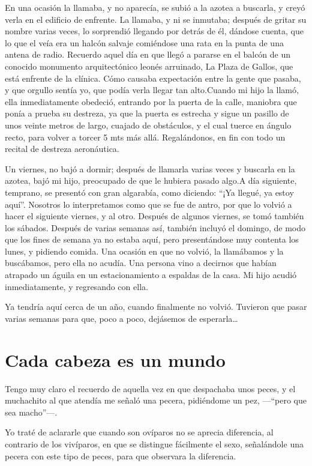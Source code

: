 \documentclass[letterpaper, 12pt]{book}
\begin{document}
En una ocasión la llamaba, y no aparecía, se subió a la azotea a buscarla, y creyó verla en el edificio de enfrente. La llamaba, y ni se inmutaba; después de gritar su nombre varias veces, lo sorprendió llegando por detrás de él, dándose cuenta, que lo que el veía era un halcón salvaje comiéndose una rata en la punta de una antena de radio. Recuerdo aquel día en que llegó a pararse en el balcón de un conocido monumento arquitectónico leonés arruinado, La Plaza de Gallos, que está enfrente de la clínica. Cómo causaba expectación entre la gente que pasaba, y que orgullo sentía yo, que podía verla llegar tan alto.Cuando mi hijo la llamó, ella inmediatamente obedeció, entrando por la puerta de la calle, maniobra que ponía a prueba su destreza, ya que la puerta es estrecha y sigue un pasillo de unos veinte metros de largo, cuajado de obstáculos, y el cual tuerce en ángulo recto, para volver a torcer 5 mts más allá. Regalándonos, en fin con todo un recital de destreza aeronáutica.


Un viernes, no bajó a dormir; después de llamarla varias veces y buscarla en la azotea, bajó mi hijo, preocupado de que le hubiera pasado algo.A día siguiente, temprano, se presentó con gran algarabía, como diciendo: ``¡Ya llegué, ya estoy aquí''. Nosotros lo interpretamos como que se fue de antro, por que lo volvió a hacer el siguiente viernes, y al otro. Después de algunos viernes, se tomó también los sábados. Después de varias semanas así, también incluyó el domingo, de modo que los fines de semana ya no estaba aquí, pero presentándose muy contenta los lunes, y pidiendo comida. Una ocasión en que no volvió, la llamábamos y  la buscábamos, pero ella no acudía. Una persona vino a decirnos que habían atrapado un águila en un estacionamiento a espaldas de la casa. Mi hijo acudió inmediatamente, y regresando con ella. 


Ya tendría aquí cerca de un año, cuando finalmente no volvió. Tuvieron que pasar varias semanas para que, poco a poco, dejásemos de esperarla\ldots


\chapter{Cada cabeza es un mundo}
Tengo muy claro el recuerdo de aquella vez en que despachaba unos peces, y el muchachito al que atendía me señaló una pecera, pidiéndome un pez, ---``pero que sea macho''---.

Yo traté de aclararle que cuando son ovíparos no se aprecia diferencia, al contrario de los vivíparos, en que se distingue fácilmente el sexo, señalándole una pecera con este tipo de peces, para que observara la diferencia.
\end{document}
